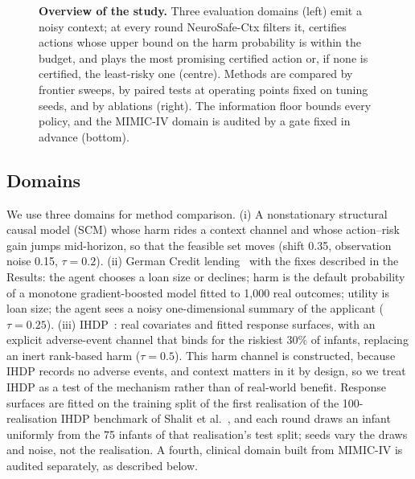 \documentclass[10pt,a4paper]{article}
\begin{document}
\begin{figure}[t]
\centering
\resizebox{0.92\linewidth}{!}{}
\caption{\textbf{Overview of the study.} Three evaluation domains (left) emit a noisy context; at
every round NeuroSafe-Ctx filters it, certifies actions whose upper bound on the harm probability is
within the budget, and plays the most promising certified action or, if none is certified, the
least-risky one (centre). Methods are compared by frontier sweeps, by paired tests at operating points
fixed on tuning seeds, and by ablations (right). The information floor bounds every policy, and the
MIMIC-IV domain is audited by a gate fixed in advance (bottom).}
\label{fig:overview}
\end{figure}

\subsection*{Domains}
We use three domains for method comparison. (i) A nonstationary structural causal model (SCM) whose
harm rides a context channel and whose action--risk gain jumps mid-horizon, so that the feasible set
moves (shift 0.35, observation noise 0.15, $\tau=0.2$). (ii) German Credit lending~\cite{hofmann1994}
with the fixes described in the Results: the agent chooses a loan size or declines; harm is the
default probability of a monotone gradient-boosted model fitted to 1,000 real outcomes; utility is
loan size; the agent sees a noisy one-dimensional summary of the applicant ($\tau=0.25$). (iii)
IHDP~\cite{hill2011}: real covariates and fitted response surfaces, with an explicit adverse-event
channel that binds for the riskiest 30\% of infants, replacing an inert rank-based harm ($\tau=0.5$). This harm channel is constructed, because IHDP records no adverse events, and context matters in it by design, so we treat IHDP as a test of the mechanism rather than of real-world benefit. Response surfaces are fitted on the training split of the first realisation of the 100-realisation IHDP benchmark of Shalit et al.~\cite{shalit2017}, and each round draws an infant uniformly from the 75 infants of that realisation's test split; seeds vary the draws and noise, not the realisation.
A fourth, clinical domain built from MIMIC-IV is audited separately, as described below.
\end{document}
